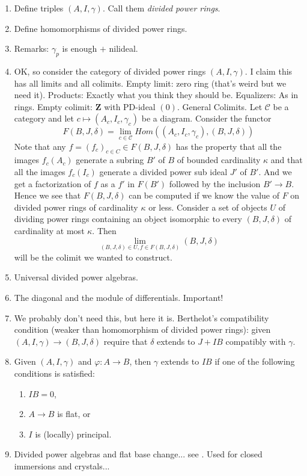 \begin{enumerate}
\item Define triples $(A, I, \gamma)$. Call them {\it divided power rings}.
\item Define homomorphisms of divided power rings.
\item Remarks: $\gamma_p$ is enough $+$ nilideal.
\item OK, so consider the category of divided power rings $(A, I, \gamma)$.
I claim this has all limits and all colimits.
Empty limit: zero ring (that's weird but we need it).
Products: Exactly what you think they should be.
Equalizers: As in rings.
Empty colimit: $\mathbf{Z}$ with PD-ideal $(0)$.
General Colimits. Let $\mathcal{C}$ be a category and let
$c \mapsto (A_c, I_c, \gamma_c)$ be a diagram. Consider the functor
$$
F(B, J, \delta) = \lim_{c \in \mathcal{C}}
Hom((A_c, I_c, \gamma_c), (B, J, \delta))
$$
Note that any $f = (f_c)_{c \in C} \in F(B, J, \delta)$ has the property
that all the images $f_c(A_c)$ generate a subring $B'$ of $B$ of bounded
cardinality $\kappa$ and that all the images $f_c(I_c)$ generate a
divided power sub ideal $J'$ of $B'$. And we get a factorization of
$f$ as a $f'$ in $F(B')$ followed by the inclusion $B' \to B$.
Hence we see that $F(B, J, \delta)$ can be computed if we know the value
of $F$ on divided power rings of
cardinality $\kappa$ or less. Consider a set of objects $U$ of
dividing power rings containing an object isomorphic to every
$(B, J, \delta)$ of cardinality
at most $\kappa$. Then
$$
\lim_{(B, J, \delta) \in U, f \in F(B, J, \delta)} (B, J, \delta)
$$
will be the colimit we wanted to construct.
\item Universal divided power algebras.
\item The diagonal and the module of differentials. Important!
\item We probably don't need this, but here it is.
Berthelot's compatibility condition (weaker than homomorphism
of divided power rings): given $(A, I, \gamma) \to (B, J, \delta)$
require that $\delta$ extends to $J + IB$ compatibly with $\gamma$.
\item Given $(A, I, \gamma)$ and $\varphi : A \to B$, then $\gamma$
extends to $IB$ if one of the following conditions is satisfied:
\begin{enumerate}
\item $IB = 0$,
\item $A \to B$ is flat, or
\item $I$ is (locally) principal.
\end{enumerate}
\item Divided power algebras and flat base change... see
\cite[Proposition 2.1.7]{dJ-crystalline}. Used for closed immersions
and crystals...
\end{enumerate}





